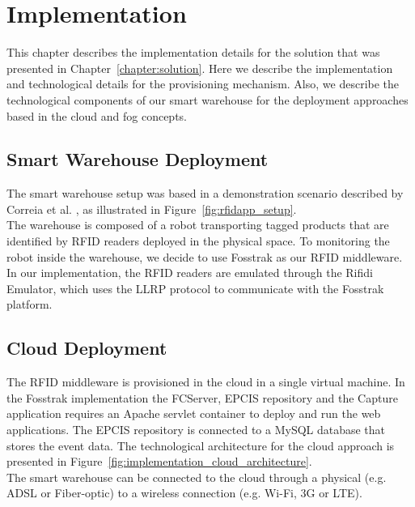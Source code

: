 
\section{Implementation}
\label{sec:implementation}
This chapter describes the implementation details for the solution that was presented in Chapter~\ref{chapter:solution}.
Here we describe the implementation and technological details for the provisioning mechanism.
Also, we describe the technological components of our smart warehouse for the deployment approaches
based in the cloud and fog concepts.

\subsection{Smart Warehouse Deployment}
\label{sub:impl_smart_place}
The smart warehouse setup was based in a demonstration scenario described by Correia et al. \cite{correiaalpharfid},
as illustrated in Figure~\ref{fig:rfidapp_setup}.\\
The warehouse is composed of a robot transporting tagged products that are identified by \gls{RFID} readers
deployed in the physical space. To monitoring the robot inside the warehouse, we decide to use Fosstrak
as our \gls{RFID} middleware. In our implementation, the \gls{RFID} readers are emulated through the
Rifidi Emulator, which uses the \gls{LLRP} protocol to communicate with the Fosstrak platform.

\subsection{Cloud Deployment}
\label{sub:imp_smart_warehouse_cloud}

The \gls{RFID} middleware is provisioned in the cloud in a single virtual machine. In the
Fosstrak implementation the \gls{FCServer}, \gls{EPCIS} repository and the Capture application
requires an Apache servlet container to deploy and run the web applications. The \gls{EPCIS}
repository is connected to a MySQL database that stores the event data. The technological architecture
for the cloud approach is presented in Figure~\ref{fig:implementation_cloud_architecture}.\\

The smart warehouse can be connected to the cloud through a physical (e.g. \gls{ADSL} or Fiber-optic)
to a wireless connection (e.g. Wi-Fi, 3G or \gls{LTE}).

